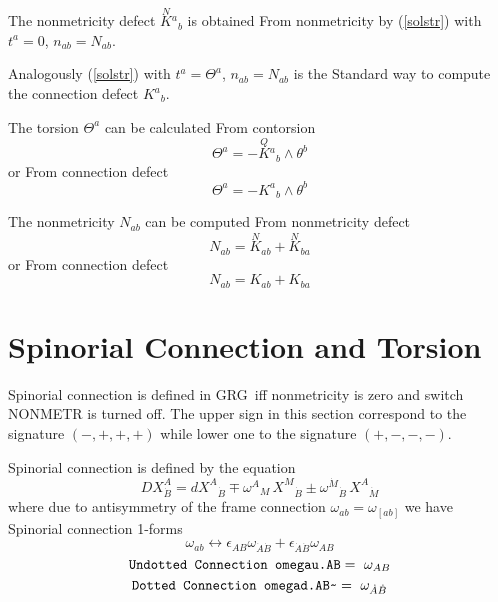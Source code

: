 \documentclass[twoside,openright]{report}
\newcommand{\grgtt}{\ttfamily}
\newcommand{\object}[2]{%
\begin{equation}
\mbox{\comm{#1}} =\ #2
\end{equation}}
\newcommand{\tsst}{\longleftrightarrow}
\renewcommand{\tt}{\grgtt}
\newcommand{\cc}{{\tt \char'176}}           %
\newcommand{\grg}{{\sc GRG}}
\newcommand{\comm}[1]{{\upshape\tt#1}}    %
\begin{document}
The nonmetricity defect $\stackrel{\scriptscriptstyle N}{K}\!{}^a{}_b$
is obtained {\tt From nonmetricity} by (\ref{solstr})
with $t^a=0$, $n_{ab}=N_{ab}$.

Analogously (\ref{solstr}) with $t^a=\Theta^a$, $n_{ab}=N_{ab}$
is the {\tt Standard way} to compute the connection defect $K^a{}_b$.

The torsion $\Theta^a$ can be calculated {\tt From contorsion}
\begin{equation}
\Theta^a = -\stackrel{\scriptscriptstyle Q}{K}\!{}^a{}_b\wedge\theta^b
\end{equation}
or {\tt From connection defect}
\begin{equation}
\Theta^a = -K^a{}_b\wedge\theta^b
\end{equation}

The nonmetricity $N_{ab}$ can be computed {\tt From nonmetricity defect}
\begin{equation}
N_{ab} = \stackrel{\scriptscriptstyle N}{K}_{ab}+
\stackrel{\scriptscriptstyle N}{K}_{ba}
\end{equation}
or {\tt From connection defect}
\begin{equation}
N_{ab} = K_{ab}+K_{ba}
\end{equation}


\section{Spinorial Connection and Torsion}

Spinorial connection is defined in \grg\ iff nonmetricity
is zero and switch \comm{NONMETR} is turned off.
The upper sign in this section correspond to the signature
${\scriptstyle(-,+,+,+)}$ while lower one to the signature
${\scriptstyle(+,-,-,-)}$.

Spinorial connection is defined by the equation
\begin{equation}
DX^A_{\dot B} = dX^A{}_{\dot B}
\mp\omega^A{}_M\,X^M{}_{\dot B}
\pm\omega^{\dot M}{}_{\dot B}\,X^A{}_{\dot M}
\end{equation}
where due to antisymmetry of the frame connection
$\omega_{ab}=\omega_{[ab]}$ we have {\tt Spinorial connection}
1-forms
\begin{equation}
\omega_{ab} \tsst
\epsilon_{AB} \omega_{\dot A\dot B}
+ \epsilon_{\dot A\dot B} \omega_{AB}
\end{equation}
\object{Undotted Connection omegau.AB}{\omega_{AB}}
\object{Dotted Connection omegad.AB\cc}{\omega_{\dot A\dot B}}
\end{document}
